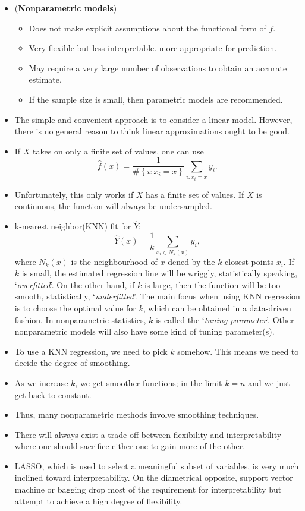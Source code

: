 \documentclass[11pt]{article}
\begin{document}
\begin{itemize}
  \item (\textbf{Nonparametric models}) \begin{itemize} \item Does not make explicit assumptions about the functional form of $f$. \item Very flexible but less interpretable. more appropriate for prediction. \item May require a very large number of observations to obtain an accurate estimate. \item If the sample size is small, then parametric models are recommended. \end{itemize}
  \item The simple and convenient approach is to consider a linear model. However, there is no general reason to think linear approximations ought to be good.
  \item If $X$ takes on only a finite set of values, one can use
  $$
    \hat{f}\left(x\right) = \frac{1}{\#\left\{i: x_{i}= x \right\}}\sum_{i:x_{i}=x} y_{i}.
  $$
  \item Unfortunately, this only works if $X$ has a finite set of values. If $X$ is continuous, the function will always be undersampled.
  \item k-nearest neighbor(KNN) fit for $\widehat{Y}$:
  $$
    \widehat{Y}\left(x\right) = \frac{1}{k}\sum_{x_{i}\in N_{k}\left(x\right)} y_{i},
  $$
  where $N_{k}\left(x\right)$ is the neighbourhood of $x$ dened by the $k$ closest points $x_{i}$. If $k$ is small, the estimated regression line will be wriggly, statistically speaking, `\emph{overfitted}'. On the other hand, if $k$ is large, then the function will be too smooth, statistically, `\emph{underfitted}'. The main focus when using KNN regression is to choose the optimal value for $k$, which can be obtained in a data-driven fashion. In nonparametric statistics, $k$ is called the `\emph{tuning parameter}'. Other nonparametric models will also have some kind of tuning parameter(s).
  \item To use a KNN regression, we need to pick $k$ somehow. This means we need to decide the degree of smoothing.
  \item As we increase $k$, we get smoother functions; in the limit $k=n$ and we just get back to constant.
  \item Thus, many nonparametric methods involve smoothing techniques.
  \item There will always exist a trade-off between flexibility and interpretability where one should sacrifice either one to gain more of the other.
  \item LASSO, which is used to select a meaningful subset of variables, is very much inclined toward interpretability. On the diametrical opposite, support vector machine or bagging drop most of the requirement for interpretability but attempt to achieve a high degree of flexibility.
\end{itemize}
\end{document}
